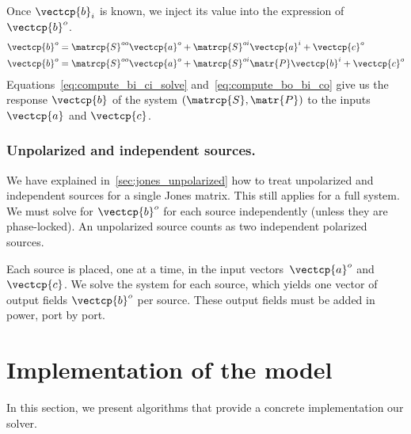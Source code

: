 Once $\vectcp{b}_i$ is known, we inject its value into the expression of $\vectcp{b}^o$.
\begin{subequations}
    \label{eq:compute_bo_co}
    \begin{align}
        \vectcp{b}^o
        &=
        \matrcp{S}^{oo} \vectcp{a}^o +
        \matrcp{S}^{oi} \vectcp{a}^i +
        \vectcp{c}^o
        \label{eq:compute_bo_ai_co}
        \\
        \vectcp{b}^o
        &=
        \matrcp{S}^{oo} \vectcp{a}^o +
        \matrcp{S}^{oi} \matr{P} \vectcp{b}^i +
        \vectcp{c}^o
        \label{eq:compute_bo_bi_co}
    \end{align}
\end{subequations}
Equations~\eqref{eq:compute_bi_ci_solve} and~\eqref{eq:compute_bo_bi_co} give us the response $\vectcp{b}$ of the system $(\matrcp{S}, \matr{P})$ to the inputs $\vectcp{a}$ and $\vectcp{c}$.




\subsubsection{Unpolarized and independent sources.}

We have explained in~\cref{sec:jones_unpolarized} how to treat unpolarized and independent sources for a single Jones matrix.
This still applies for a full system.
We must solve for $\vectcp{b}^o$ for each source independently (unless they are phase-locked).
An unpolarized source counts as two independent polarized sources.

Each source is placed, one at a time, in the input vectors~$\vectcp{a}^o$ and~$\vectcp{c}$.
We solve the system for each source, which yields one vector of output fields $\vectcp{b}^o$ per source.
These output fields must be added in power, port by port.



\FloatBarrier
\section{Implementation of the model}
\label{sec:solver_implementation}
In this section, we present algorithms that provide a concrete implementation our solver.

